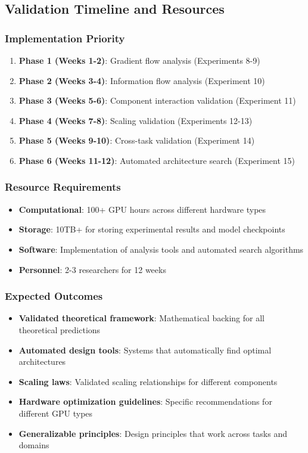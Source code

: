 \documentclass[11pt,a4paper]{article}
\begin{document}
\subsection{Validation Timeline and Resources}

\subsubsection{Implementation Priority}
\begin{enumerate}
    \item \textbf{Phase 1 (Weeks 1-2)}: Gradient flow analysis (Experiments 8-9)
    \item \textbf{Phase 2 (Weeks 3-4)}: Information flow analysis (Experiment 10)
    \item \textbf{Phase 3 (Weeks 5-6)}: Component interaction validation (Experiment 11)
    \item \textbf{Phase 4 (Weeks 7-8)}: Scaling validation (Experiments 12-13)
    \item \textbf{Phase 5 (Weeks 9-10)}: Cross-task validation (Experiment 14)
    \item \textbf{Phase 6 (Weeks 11-12)}: Automated architecture search (Experiment 15)
\end{enumerate}

\subsubsection{Resource Requirements}
\begin{itemize}
    \item \textbf{Computational}: 100+ GPU hours across different hardware types
    \item \textbf{Storage}: 10TB+ for storing experimental results and model checkpoints
    \item \textbf{Software}: Implementation of analysis tools and automated search algorithms
    \item \textbf{Personnel}: 2-3 researchers for 12 weeks
\end{itemize}

\subsubsection{Expected Outcomes}
\begin{itemize}
    \item \textbf{Validated theoretical framework}: Mathematical backing for all theoretical predictions
    \item \textbf{Automated design tools}: Systems that automatically find optimal architectures
    \item \textbf{Scaling laws}: Validated scaling relationships for different components
    \item \textbf{Hardware optimization guidelines}: Specific recommendations for different GPU types
    \item \textbf{Generalizable principles}: Design principles that work across tasks and domains
\end{itemize}
\end{document}
